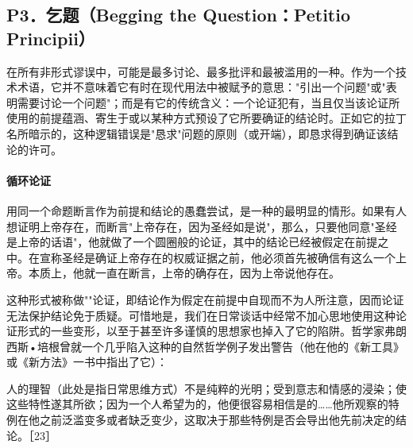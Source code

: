 \subsection{P3．乞题（Begging the Question：Petitio Principii）}

\begin{theorembox}[title=乞题谬误的定义]
在所有非形式谬误中，可能是最多讨论、最多批评和最被滥用的一种。作为一个技术术语，它并不意味着它有时在现代用法中被赋予的意思："引出一个问题"或"表明需要讨论一个问题"；而是有它的传统含义：一个论证犯有，当且仅当该论证所使用的前提蕴涵、寄生于或以某种方式预设了它所要确证的结论时。正如它的拉丁名所暗示的，这种逻辑错误是"恳求"问题的原则（或开端），即恳求得到确证该结论的许可。
\end{theorembox}

\paragraph{循环论证}
\begin{examplebox}[title=循环论证的典型例子]
用同一个命题断言作为前提和结论的愚蠢尝试，是一种的最明显的情形。如果有人想证明上帝存在，而断言"上帝存在，因为圣经如是说"，那么，只要他同意"圣经是上帝的话语"，他就做了一个圆圈般的论证，其中的结论已经被假定在前提之中。在宣称圣经是确证上帝存在的权威证据之前，他必须首先被确信有这么一个上帝。本质上，他就一直在断言，上帝的确存在，因为上帝说他存在。
\end{examplebox}

这种形式被称做""论证，即结论作为假定在前提中自现而不为人所注意，因而论证无法保护结论免于质疑。可惜地是，我们在日常谈话中经常不加心思地使用这种论证形式的一些变形，以至于甚至许多谨慎的思想家也掉入了它的陷阱。哲学家弗朗西斯•培根曾就一个几乎陷入这种的自然哲学例子发出警告（他在他的《新工具》或《新方法》一书中指出了它）：

\begin{logicbox}[title=培根的警告]
人的理智（此处是指日常思维方式）不是纯粹的光明；受到意志和情感的浸染；使这些特性遂其所欲；因为一个人希望为的，他便很容易相信是的……他所观察的特例在他之前泛滥变多或者缺乏变少，这取决于那些特例是否会导出他先前决定的结论。［23］
\end{logicbox}

